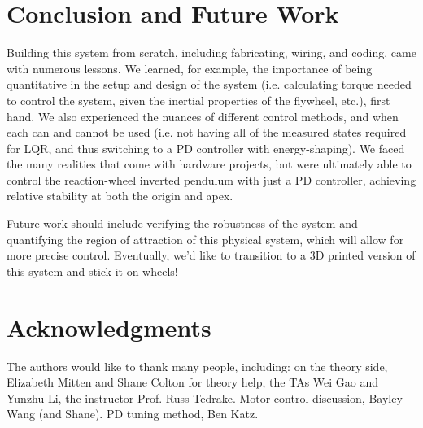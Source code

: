 \documentclass[conference]{IEEEtran}
\begin{document}
\section{Conclusion and Future Work}

Building this system from scratch, including fabricating, wiring, and coding,
came with numerous lessons. We learned, for example, the importance of being
quantitative in the setup and design of the system (i.e. calculating torque
needed to control the system, given the inertial properties of the flywheel,
etc.), first hand. We also experienced the nuances of different control methods,
and when each can and cannot be used (i.e. not having all of the measured states
required for LQR, and thus switching to a PD controller with energy-shaping). We
faced the many realities that come with hardware projects, but were ultimately
able to control the reaction-wheel inverted pendulum with just a PD controller,
achieving relative stability at both the origin and apex. 

Future work should include verifying the robustness of the system and quantifying the region of
attraction of this physical system, which will allow for more precise control. Eventually, we'd like to transition to a 3D printed version of this system and stick it on wheels!

\newpage
\section*{Acknowledgments}

The authors would like to thank many people, including: on the theory side,
Elizabeth Mitten and Shane Colton for theory help, the TAs Wei Gao and Yunzhu
Li, the instructor Prof. Russ Tedrake. Motor control discussion, Bayley Wang
(and Shane). PD tuning method, Ben Katz.




\bibdata


\end{document}
